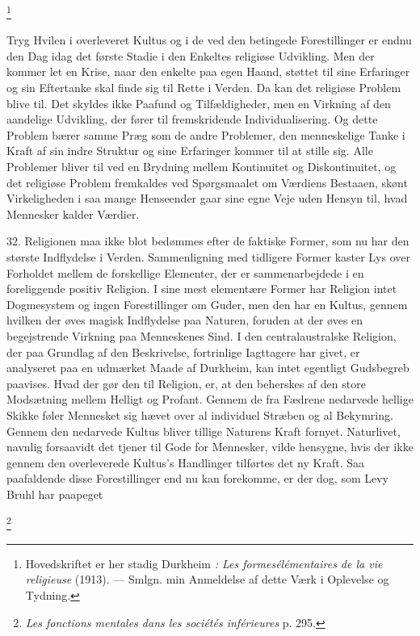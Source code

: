 \documentclass[12pt]{article}
\newcommand{\apage}[1]{\marginnote{\footnotesize\textit{[#1]}}}
\begin{document}
         \footnote{Hovedskriftet er her stadig Durkheim \textit{: Les
formes}\textit{élémentaires de la vie religieuse} (1913). --- Smlgn. min
Anmeldelse af dette Værk i \guillemotright{}Oplevelse og Tydning\guillemotleft{}.}

       Tryg Hvilen i overleveret Kultus og i de ved den betingede
Forestillinger er endnu den Dag idag det første Stadie i den Enkeltes religiøse
Udvikling. Men der kommer let en Krise, naar den enkelte paa egen Haand,
støttet til sine Erfaringer og sin Eftertanke skal finde sig til Rette i
Verden. Da kan det religiøse Problem blive til. Det skyldes ikke Paafund og
Tilfældigheder, men en Virkning af den aandelige Udvikling, der fører til
fremskridende Individualisering. Og
\setcounter{footnote}{0}%
\apage{107}dette Problem bærer samme Præg som de andre Problemer, den
menneskelige Tanke i Kraft af sin indre Struktur og sine Erfaringer kommer til
at stille sig. Alle Problemer bliver til ved en Brydning mellem Kontinuitet og
Diskontinuitet, og det religiøse Problem fremkaldes ved Spørgsmaalet om
Værdiens Bestaaen, skønt Virkeligheden i saa mange Henseender gaar sine egne
Veje uden Hensyn til, hvad Mennesker kalder Værdier.

32. Religionen maa ikke blot bedømmes efter de faktiske Former, som nu har den
største Indflydelse i Verden. Sammenligning med tidligere Former kaster Lys
over Forholdet mellem de forskellige Elementer, der er sammenarbejdede i en
foreliggende positiv Religion. I sine mest elementære Former har Religion intet
Dogmesystem og ingen Forestillinger om Guder, men den har en Kultus, gennem
hvilken der øves magisk Indflydelse paa Naturen, foruden at der øves en
begejstrende Virkning paa Menneskenes Sind. I den centralaustralske Religion,
der paa Grundlag af den Beskrivelse, fortrinlige Iagttagere har givet, er
analyseret paa en udmærket Maade af Durkheim, kan intet egentligt Gudsbegreb
paavises. Hvad der gør den til Religion, er, at den beherskes af den store
Modsætning mellem Helligt og Profant. Gennem de fra Fædrene nedarvede hellige
Skikke føler Mennesket sig hævet over al individuel Stræben og al Bekymring.
Gennem den nedarvede Kultus bliver tillige Naturens Kraft fornyet. Naturlivet,
navnlig forsaavidt det tjener til Gode for Mennesker, vilde hensygne, hvis der
ikke gennem den overleverede Kultus's Handlinger tilførtes det ny Kraft. Saa
paafaldende disse Forestillinger end nu kan forekomme, er der dog, som Levy
Bruhl har paapeget

         \footnote{\textit{Les fonctions mentales dans les sociétés
inférieures} p. 295.}
\end{document}
